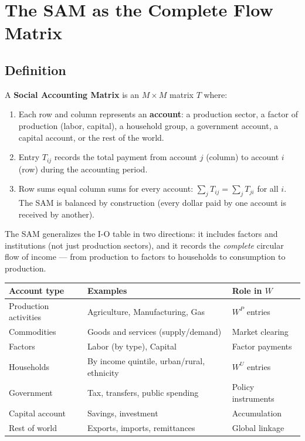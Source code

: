 \documentclass[../structural_economics_book.tex]{subfiles}
\begin{document}
\section{The SAM as the Complete Flow Matrix}
\label{ch20:sec:sam}

\subsection{Definition}

\begin{definition}\label{ch20:def:sam}
A \textbf{Social Accounting Matrix} is an $M \times M$ matrix $T$ where:
\begin{enumerate}
\item Each row and column represents an \textbf{account}: a production sector, a factor of production (labor, capital), a household group, a government account, a capital account, or the rest of the world.
\item Entry $T_{ij}$ records the total payment from account $j$ (column) to account $i$ (row) during the accounting period.
\item Row sums equal column sums for every account: $\sum_j T_{ij} = \sum_j T_{ji}$ for all $i$. The SAM is balanced by construction (every dollar paid by one account is received by another).
\end{enumerate}
\end{definition}

The SAM generalizes the I-O table in two directions: it includes factors and institutions (not just production sectors), and it records the \textit{complete} circular flow of income --- from production to factors to households to consumption to production.

\begin{definition}\label{ch20:def:accounts}
\begin{center}
\begin{tabular}{lll}
\toprule
\textbf{Account type} & \textbf{Examples} & \textbf{Role in $W$} \\
\midrule
Production activities & Agriculture, Manufacturing, Gas & $W^P$ entries \\
Commodities & Goods and services (supply/demand) & Market clearing \\
Factors & Labor (by type), Capital & Factor payments \\
Households & By income quintile, urban/rural, ethnicity & $W^U$ entries \\
Government & Tax, transfers, public spending & Policy instruments \\
Capital account & Savings, investment & Accumulation \\
Rest of world & Exports, imports, remittances & Global linkage \\
\bottomrule
\end{tabular}
\end{center}
\end{definition}
\end{document}

